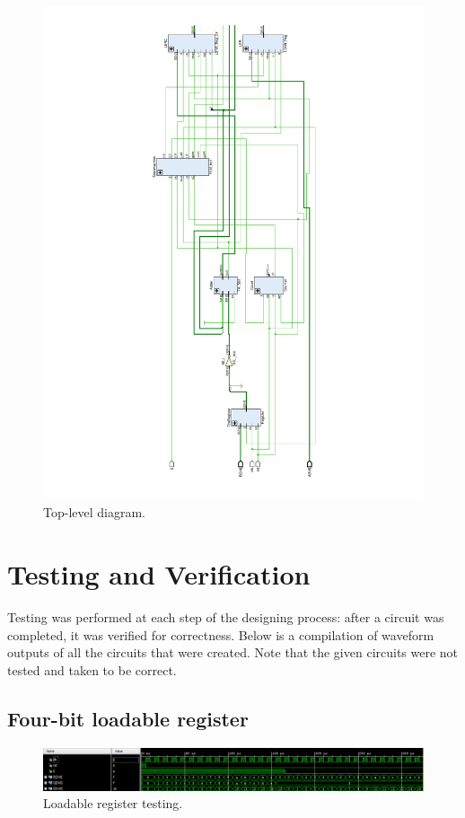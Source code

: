 \documentclass{article}
\begin{document}
\begin{figure}[H]
    \centering
    \includegraphics[height=\textwidth, angle=-90]{Images/schematic_top}
    \caption{Top-level diagram.}
    \label{blockdiagram:top}
\end{figure}

\section{Testing and Verification} Testing was performed at
each step of the designing process: after a circuit was
completed, it was verified for correctness. Below is a
compilation of waveform outputs of all the circuits
that were created. Note that the given circuits were not
tested and taken to be correct.

\subsection{Four-bit loadable register}
\begin{figure}[H]
    \centering
    \includegraphics[width=\textwidth]{Images/Register_waveform}
    \caption{Loadable register testing.}
    \label{test:register}
\end{figure}
\end{document}
